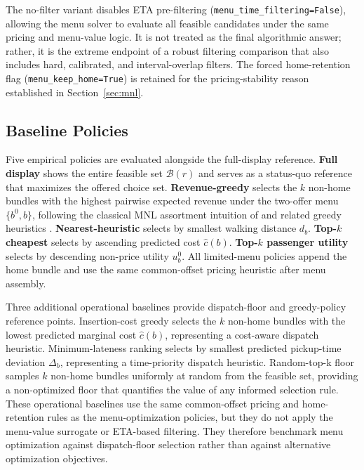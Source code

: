 The no-filter variant disables ETA pre-filtering (\texttt{menu\_time\_filtering=False}),
allowing the menu solver to evaluate all feasible candidates under the same pricing
and menu-value logic. It is not treated as the final algorithmic answer; rather, it is
the extreme endpoint of a robust filtering comparison that also includes hard,
calibrated, and interval-overlap filters. The forced home-retention flag
(\texttt{menu\_keep\_home=True}) is retained for the pricing-stability reason
established in Section~\ref{sec:mnl}.

\subsection{Baseline Policies}
\label{sec:baselines}

Five empirical policies are evaluated alongside the full-display reference. \textbf{Full display} shows the entire feasible set $\mathcal{B}(r)$ and serves as a status-quo reference that maximizes the offered choice set. \textbf{Revenue-greedy} selects the $k$ non-home bundles with the highest pairwise expected revenue under the two-offer menu $\{b^0,b\}$, following the classical MNL assortment intuition of \citet{talluri2004revenue} and related greedy heuristics \citep{rusmevichientong2010dynamic}. \textbf{Nearest-heuristic} selects by smallest walking distance $d_b$. \textbf{Top-$k$ cheapest} selects by ascending predicted cost $\hat{c}(b)$. \textbf{Top-$k$ passenger utility} selects by descending non-price utility $u_b^0$. All limited-menu policies append the home bundle and use the same common-offset pricing heuristic after menu assembly.

Three additional operational baselines provide dispatch-floor and greedy-policy reference points. Insertion-cost greedy selects the $k$ non-home bundles with the lowest predicted marginal cost $\hat{c}(b)$, representing a cost-aware dispatch heuristic. Minimum-lateness ranking selects by smallest predicted pickup-time deviation $\Delta_b$, representing a time-priority dispatch heuristic. Random-top-k floor samples $k$ non-home bundles uniformly at random from the feasible set, providing a non-optimized floor that quantifies the value of any informed selection rule. These operational baselines use the same common-offset pricing and home-retention rules as the menu-optimization policies, but they do not apply the menu-value surrogate or ETA-based filtering. They therefore benchmark menu optimization against dispatch-floor selection rather than against alternative optimization objectives.

